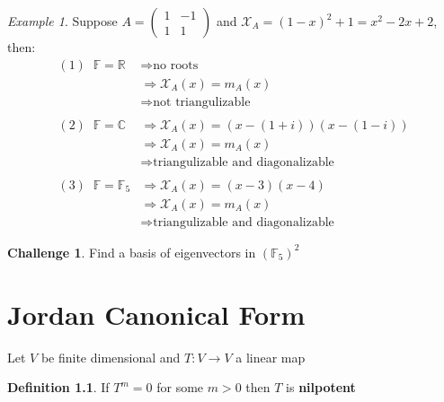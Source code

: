 \documentclass[11pt, a4paper]{report}
\numberwithin{equation}{section}
\renewcommand{\chi}{\mathcal{X}}
\newcommand{\R}{\mathbb{R}}
\newcommand{\C}{\mathbb{C}}
\newcommand{\F}{\mathbb{F}}
\newcommand{\smp}[1]{\left(\begin{smallmatrix}#1\end{smallmatrix}\right)}
\numberwithin{equation}{subsection}
\theoremstyle{plain}
\theoremstyle{definition}
\newtheorem{defn}{Definition}[chapter]
\newtheorem{ch}{Challenge}
\theoremstyle{remark}
\newtheorem{exmp}{Example}[chapter]
\begin{document}
\begin{exmp}
Suppose $A = \smp{1 & -1 \\ 1 & 1}$ and $\chi_A = (1-x)^2 + 1 = x^2 - 2x + 2$, then:
\begin{align*}
(1)\;\; \F = \R 	&\Longrightarrow \text{no roots}\\
		&\Longrightarrow \chi_A(x) = m_A(x)\\
		&\Longrightarrow \text{not triangulizable}\\\\
(2)\;\; \F = \C	&\Longrightarrow \chi_A(x) = (x - (1+i))(x - (1-i))\\
		&\Longrightarrow \chi_A(x) = m_A(x) \tag{distinct roots}\\
		&\Longrightarrow \text{triangulizable and diagonalizable} \\\\
(3)\;\; \F = \F_5 &\Longrightarrow \chi_A(x) = (x-3)(x-4)\\
		&\Longrightarrow \chi_A(x) = m_A(x) \tag{distinct roots}\\
		&\Longrightarrow \text{triangulizable and diagonalizable}
\end{align*}

\end{exmp}

\begin{ch} Find a basis of eigenvectors in $(\F_5)^2$ \end{ch}

\chapter{Jordan Canonical Form}
Let $V$ be finite dimensional and $T: V \to V$ a linear map

\begin{defn} If $T^m = 0$ for some $m > 0$ then $T$ is \textbf{nilpotent} \end{defn}
\end{document}
